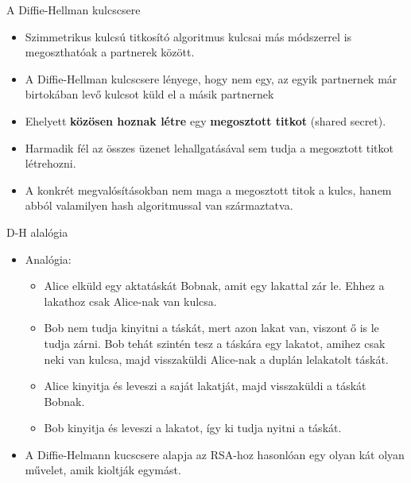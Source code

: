 \documentclass[12 pt]{beamer}
\begin{document}
\begin{frame}{A Diffie-Hellman kulcscsere}
  \begin{itemize}
    \item{Szimmetrikus kulcsú titkosító algoritmus kulcsai más módszerrel is megoszthatóak a partnerek között.}
    \item{A Diffie-Hellman kulcscsere lényege, hogy nem egy, az egyik partnernek már birtokában levő kulcsot küld el a másik partnernek}
    \item{Ehelyett \textbf{közösen hoznak létre} egy \textbf{megosztott titkot} (shared secret).}
    \item{Harmadik fél az összes üzenet lehallgatásával sem tudja a megosztott titkot létrehozni.}
    \item{A konkrét megvalósításokban nem maga a megosztott titok a kulcs, hanem abból valamilyen hash algoritmussal van származtatva.}
  \end{itemize}
\end{frame}
\begin{frame}{D-H alalógia}
  \begin{itemize}
    \item{Analógia:}
      \begin{itemize}
        \item{Alice elküld egy aktatáskát Bobnak, amit egy lakattal zár le. Ehhez a lakathoz csak Alice-nak van kulcsa.}
        \item{Bob nem tudja kinyitni a táskát, mert azon lakat van, viszont ő is le tudja zárni. Bob tehát szintén tesz a táskára egy lakatot, amihez csak neki van kulcsa, majd visszaküldi Alice-nak a duplán lelakatolt táskát.}
        \item{Alice kinyitja és leveszi a saját lakatját, majd visszaküldi a táskát Bobnak.}
        \item{Bob kinyitja és leveszi a lakatot, így ki tudja nyitni a táskát.}
      \end{itemize}
    \item{A Diffie-Helmann kucscsere alapja az RSA-hoz hasonlóan egy olyan kát olyan művelet, amik kioltják egymást.}
  \end{itemize}
\end{frame}
\end{document}
